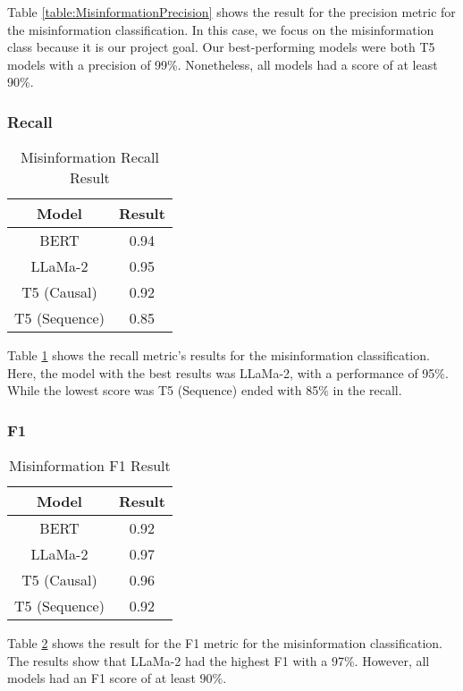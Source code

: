 Table \ref{table:MisinformationPrecision} shows the result for the precision metric for the misinformation classification. In this case, we focus on the misinformation
class because it is our project goal. Our best-performing models were both T5 models with a precision of 99\%. Nonetheless, all models had a score of at least 90\%.

\subsubsection{Recall}
\begin{table}[H]
	\centering
	\caption{Misinformation Recall Result}
	{\small
	\begin{tabular}{||c | c||} 
		\hline
		\textbf{Model} & \textbf{Result} \\ 
		\hline
		BERT & 0.94  \\
		\hline
		LLaMa-2 & 0.95 \\ 
		\hline
		T5 (Causal) & 0.92 \\
		\hline
		T5 (Sequence) & 0.85 \\
		\hline
	\end{tabular}
	}
	\label{table:MisinformationRecall}
\end{table}

Table \ref{table:MisinformationRecall} shows the recall metric's results for the misinformation classification. Here, the model with the best results was LLaMa-2,
with a performance of 95\%. While the lowest score was T5 (Sequence) ended with 85\% in the recall.

\subsubsection{F1}
\begin{table}[H]
	\centering
	\caption{Misinformation F1 Result}
	{\small
	\begin{tabular}{||c | c||} 
		\hline
		\textbf{Model} & \textbf{Result} \\  
		\hline
		BERT & 0.92  \\
		\hline
		LLaMa-2 & 0.97 \\ 
		\hline
		T5 (Causal) & 0.96 \\
		\hline
		T5 (Sequence) & 0.92 \\
		\hline
	\end{tabular}
	}
	\label{table:MisinformationF1}
\end{table}

Table \ref{table:MisinformationF1}  shows the result for the F1 metric for the misinformation classification. The results show that LLaMa-2 had the highest F1 with a 97\%.
However, all models had an F1 score of at least 90\%.

